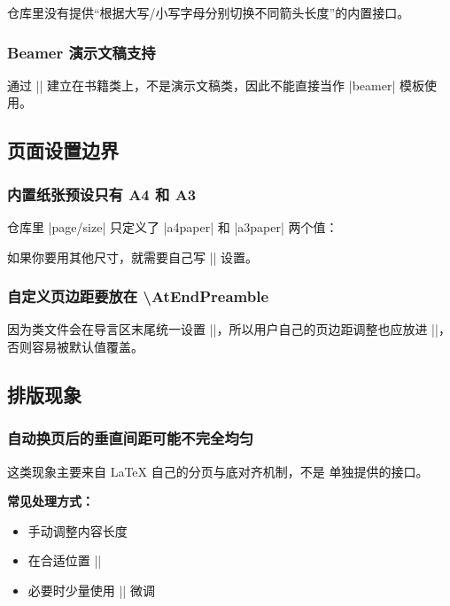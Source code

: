 仓库里没有提供“根据大写/小写字母分别切换不同箭头长度”的内置接口。

\subsubsection{Beamer 演示文稿支持}

 通过 || 建立在书籍类上，不是演示文稿类，因此不能直接当作 |beamer| 模板使用。


\subsection{页面设置边界}

\subsubsection{内置纸张预设只有 A4 和 A3}

仓库里 |page/size| 只定义了 |a4paper| 和 |a3paper| 两个值：

\begin{latexcode}
\end{latexcode}

如果你要用其他尺寸，就需要自己写 |\geometry| 设置。

\subsubsection{自定义页边距要放在 \textbackslash AtEndPreamble}

因为类文件会在导言区末尾统一设置 |\geometry|，所以用户自己的页边距调整也应放进 |\AtEndPreamble|，否则容易被默认值覆盖。


\subsection{排版现象}

\subsubsection{自动换页后的垂直间距可能不完全均匀}

这类现象主要来自 \LaTeX{} 自己的分页与底对齐机制，不是  单独提供的接口。

\textbf{常见处理方式：}
\begin{itemize}
  \item 手动调整内容长度
  \item 在合适位置 |\newpage|
  \item 必要时少量使用 |\vspace| 微调
\end{itemize}


